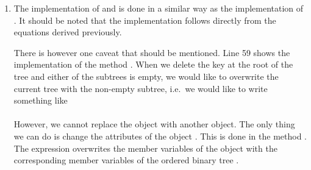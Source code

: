 \begin{enumerate}
\begin{figure}[!ht]
  \centering
\begin{verbatim}
        def delete(self, key):
            if self.isEmpty():
                return
            if key == self.mKey:
                if self.mLeft.isEmpty():
                    self._update(self.mRight)
                elif self.mRight.isEmpty():
                    self._update(self.mLeft)
                else:
                    rs, km, vm = self.mRight._delMin()
                    self.mKey   = km
                    self.mValue = vm
                    self.mRight = rs
            elif key < self.mKey:
                self.mLeft.delete(key)
            else:
                self.mRight.delete(key)
    
        def _delMin(self):
            if self.mLeft.isEmpty():
                return self.mRight, self.mKey, self.mValue
            else:
                ls, km, vm = self.mLeft._delMin()
                self.mLeft = ls
                return self, km, vm

        def _update(self, t):
            self.mKey   = t.mKey
            self.mValue = t.mValue
            self.mLeft  = t.mLeft
            self.mRight = t.mRight
\end{verbatim}
\vspace*{-0.3cm}
  \caption{Implementation of ordered binary trees in \textsl{Python}, part .}
  \label{fig:binary-tree.py-2}
\end{figure}

\item The implementation of  and  is done in a similar way as the
      implementation of .  It should be noted that the implementation follows directly from the
      equations derived  previously. 
      
      There is however one caveat that should be mentioned.  Line 59 shows the implementation of the
      method .  When we delete the key at the root of the tree and either of the
      subtrees is empty, we would like to overwrite the current tree with the non-empty
      subtree, i.e.~we would like to write something like
      \\[0.2cm]
      \hspace*{1.3cm}
      \\[0.2cm]
      However, we cannot replace the object  with another object.  The only thing we can do is
      change the attributes of the object .  This is done in the method .
      The expression  overwrites the member variables of the object  with the
      corresponding member variables of the ordered binary tree . 
\end{enumerate}

